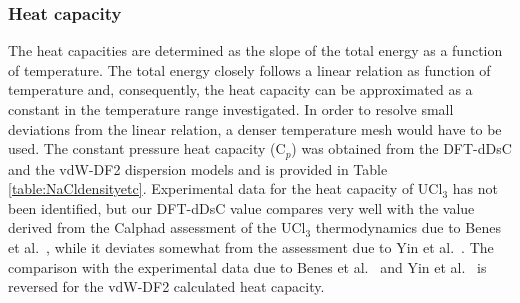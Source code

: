 \documentclass[preprint,3p,10pt,onecolumn,number,sort&compress]{elsarticle}
\begin{document}
{\subsubsection{Heat capacity} 


The heat capacities are determined as the slope of the total energy as a function of temperature. The total energy closely follows a linear relation as function of temperature and, consequently, the heat capacity can be approximated as a constant in the temperature range investigated. In order to resolve small deviations from the linear relation, a denser temperature mesh would have to be used. The constant pressure heat capacity (C$_p$) was obtained from the DFT-dDsC and the vdW-DF2 dispersion models and is provided in Table \ref{table:NaCldensityetc}. Experimental data for the heat capacity of UCl$_3$ has not been identified, but our DFT-dDsC value compares very well with the value derived from the Calphad assessment of the UCl$_3$ thermodynamics due to Benes et al.~\cite{BENES2008}, while it deviates somewhat from the assessment due to Yin et al.~\cite{YIN2020}. The comparison with the experimental data due to Benes et al.~\cite{BENES2008}  and Yin et al.~\cite{YIN2020} is reversed for the vdW-DF2 calculated heat capacity. 

}
\end{document}
